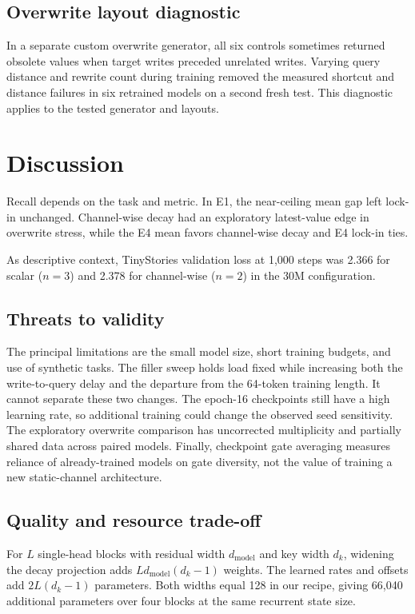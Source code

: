 \documentclass[conference]{IEEEtran}
\begin{document}
\subsection{Overwrite layout diagnostic}
In a separate custom overwrite generator, all six controls sometimes returned obsolete values when target writes preceded unrelated writes. Varying query distance and rewrite count during training removed the measured shortcut and distance failures in six retrained models on a second fresh test. This diagnostic applies to the tested generator and layouts.

\section{Discussion}
Recall depends on the task and metric. In E1, the near-ceiling mean gap left lock-in unchanged. Channel-wise decay had an exploratory latest-value edge in overwrite stress, while the E4 mean favors channel-wise decay and E4 lock-in ties.

As descriptive context, TinyStories \cite{eldan2023tinystories} validation loss at 1,000 steps was 2.366 for scalar ($n=3$) and 2.378 for channel-wise ($n=2$) in the 30M configuration.

\subsection{Threats to validity}
The principal limitations are the small model size, short training budgets, and use of synthetic tasks. The filler sweep holds load fixed while increasing both the write-to-query delay and the departure from the 64-token training length. It cannot separate these two changes. The epoch-16 checkpoints still have a high learning rate, so additional training could change the observed seed sensitivity. The exploratory overwrite comparison has uncorrected multiplicity and partially shared data across paired models. Finally, checkpoint gate averaging measures reliance of already-trained models on gate diversity, not the value of training a new static-channel architecture.

\subsection{Quality and resource trade-off}
For $L$ single-head blocks with residual width $d_{\mathrm{model}}$ and key width $d_k$, widening the decay projection adds $L d_{\mathrm{model}}(d_k-1)$ weights. The learned rates and offsets add $2L(d_k-1)$ parameters. Both widths equal 128 in our recipe, giving 66,040 additional parameters over four blocks at the same recurrent state size.
\end{document}
